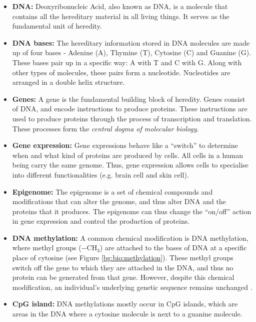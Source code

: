 \documentclass[12pt, twoside, a4paper]{report}
\begin{document}
\begin{itemize}
\item \textbf{DNA:} Deoxyribonucleic Acid, also known as DNA, is a molecule that contains all the hereditary material in all living things. It serves as the fundamental unit of heredity.

\item \textbf{DNA bases:} The hereditary information stored in DNA molecules are made up of four bases - Adenine (A), Thymine (T), Cytosine (C) and Guanine (G). These bases pair up in a specific way: A with T and C with G. Along with other types of molecules, these pairs form a nucleotide. Nucleotides are arranged in a double helix structure.

\item \textbf{Genes:} A gene is the fundamental building block of heredity. Genes consist of DNA, and encode instructions to produce proteins. These instructions are used to produce proteins through the process of transcription and translation. These processes form the \textit{central dogma of molecular biology}.

\item \textbf{Gene expression:} Gene expressions behave like a ``switch'' to determine when and what kind of proteins are produced by cells. All cells in a human being carry the same genome. Thus, gene expression allows cells to specialise into different functionalities (e.g. brain cell and skin cell).

\item \textbf{Epigenome:} The epigenome is a set of chemical compounds and modifications that can alter the genome, and thus alter DNA and the proteins that it produces. The epigenome can thus change the ``on/off'' action in gene expression and control the production of proteins.


\item \textbf{DNA methylation:} A common chemical modification is DNA methylation, where methyl groups ($-$CH$_3$) are attached to the bases of DNA at a specific place of cytosine (see Figure \ref{bg:bio:methylation}). These methyl groups switch off the gene to which they are attached in the DNA, and thus no protein can be generated from that gene. However, despite this chemical modification, an individual's underlying genetic sequence remains unchanged \cite{RefWorks:249}.

\item \textbf{CpG island:} DNA methylations mostly occur in CpG islands, which are areas in the DNA where a cytosine molecule is next to a guanine molecule. 
\end{itemize}
\end{document}
